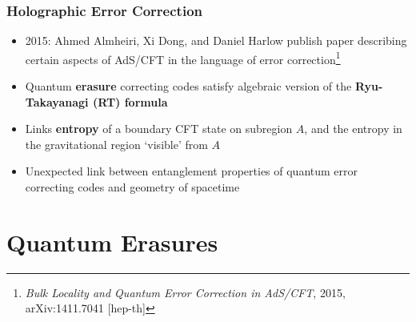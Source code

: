 \documentclass[11pt]{beamer}
\begin{document}
	\begin{frame}
		\frametitle{Holographic Error Correction}
		\begin{itemize}[<+->]
			\item 2015: Ahmed Almheiri, Xi Dong, and Daniel Harlow publish paper describing certain aspects of AdS/CFT in the language of error correction\footnote{\textit{Bulk Locality and Quantum Error Correction in AdS/CFT}, 2015, arXiv:1411.7041 [hep-th]}
			\item Quantum \textbf{erasure} correcting codes satisfy algebraic version of the \textbf{Ryu-Takayanagi (RT) formula}
			\item Links \textbf{entropy} of a boundary CFT state on subregion $A$, and the entropy in the gravitational region `visible' from $A$
			\item Unexpected link between entanglement properties of quantum error correcting codes and geometry of spacetime
		\end{itemize}
	\end{frame}
	

	\section{Quantum Erasures}
	
\end{document}
